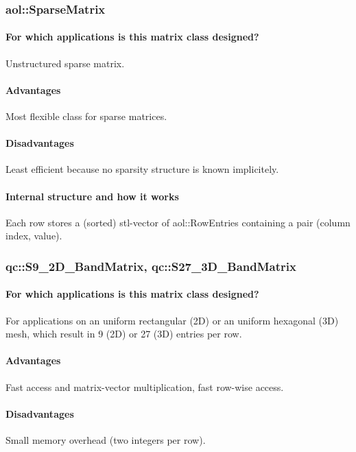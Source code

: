 \subsubsection{aol::SparseMatrix}
\paragraph{For which applications is this matrix class designed?}
Unstructured sparse matrix.

\paragraph{Advantages}
Most flexible class for sparse matrices.

\paragraph{Disadvantages}
Least efficient because no sparsity structure is known implicitely.

\paragraph{Internal structure and how it works}
Each row stores a (sorted) stl-vector of aol::RowEntries containing a
pair (column index, value).



\subsubsection{qc::S9\_2D\_BandMatrix, qc::S27\_3D\_BandMatrix}
\paragraph{For which applications is this matrix class designed?}
For applications on an uniform rectangular (2D) or an uniform hexagonal (3D) mesh,
which result in 9 (2D) or 27 (3D) entries per row.

\paragraph{Advantages}
Fast access and matrix-vector multiplication, fast row-wise access.

\paragraph{Disadvantages}
Small memory overhead (two integers per row).

